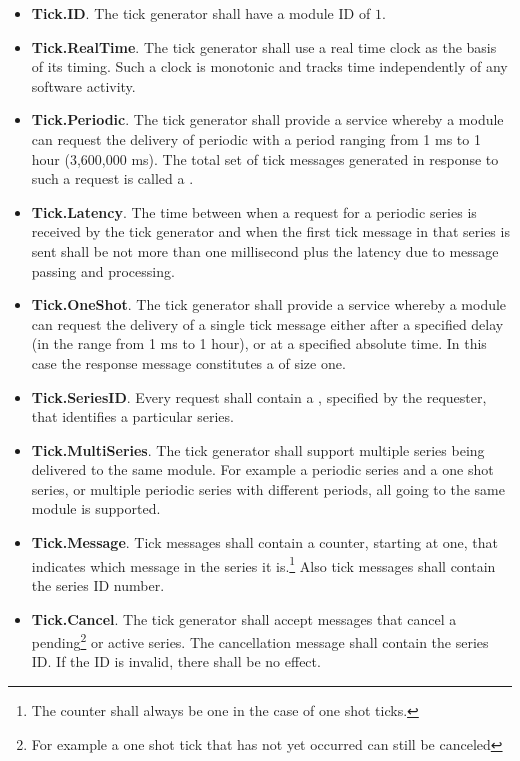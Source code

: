 \begin{itemize}
\item \textbf{Tick.ID}. The tick generator shall have a module ID of $1$.
\item \textbf{Tick.RealTime}. The tick generator shall use a real time clock as the basis of its
  timing. Such a clock is monotonic and tracks time independently of any software activity.
\item \textbf{Tick.Periodic}. The tick generator shall provide a service whereby a module can
  request the delivery of periodic  with a period ranging from 1 ms to 1
  hour (3,600,000 ms). The total set of tick messages generated in response to such a request is
  called a .
\item \textbf{Tick.Latency}. The time between when a request for a periodic series is received
  by the tick generator and when the first tick message in that series is sent shall be not more
  than one millisecond plus the latency due to message passing and processing.
\item \textbf{Tick.OneShot}. The tick generator shall provide a service whereby a module can
  request the delivery of a single tick message either after a specified delay (in the range
  from 1 ms to 1 hour), or at a specified absolute time. In this case the response message
  constitutes a  of size one.
\item \textbf{Tick.SeriesID}. Every request shall contain a , specified by
  the requester, that identifies a particular series.
\item \textbf{Tick.MultiSeries}. The tick generator shall support multiple series being
  delivered to the same module. For example a periodic series and a one shot series, or multiple
  periodic series with different periods, all going to the same module is supported.
\item \textbf{Tick.Message}. Tick messages shall contain a counter, starting at one, that
  indicates which message in the series it is.\footnote{The counter shall always be one in the
    case of one shot ticks.} Also tick messages shall contain the series ID number.
\item \textbf{Tick.Cancel}. The tick generator shall accept messages that cancel a
  pending\footnote{For example a one shot tick that has not yet occurred can still be canceled}
  or active series. The cancellation message shall contain the series ID. If the ID is invalid,
  there shall be no effect. 
\end{itemize}

